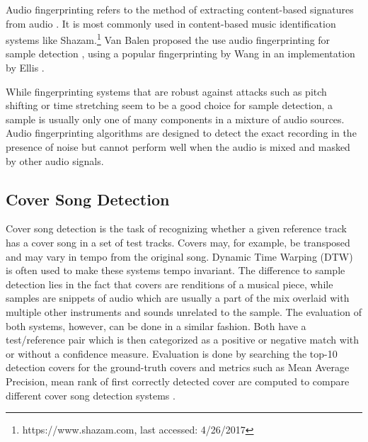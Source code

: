 \documentclass{article}
\begin{document}
Audio fingerprinting refers to the method of extracting content-based signatures from audio \cite{cano2005review,haitsma2002highly,baluja2007audio}. It is most commonly used in content-based music identification systems like Shazam.\footnote{https://www.shazam.com, last accessed: 4/26/2017}
Van Balen proposed the use audio fingerprinting for sample detection \cite{van2011automatic}, using a popular fingerprinting by Wang \cite{wang2003industrial} in an implementation by Ellis \cite{ellisfinger}. 

While fingerprinting systems that are robust against attacks such as pitch shifting or time stretching seem to be a good choice for sample detection, a sample is usually only one of many components in a mixture of audio sources. Audio fingerprinting algorithms are designed to detect the exact recording in the presence of noise but cannot perform well when the audio is mixed and masked by other audio signals.

\subsection{Cover Song Detection}
Cover song detection is the task of recognizing whether a given reference track has a cover song in a set of test tracks\cite{Ellis2007Cover,ravuri2010cover,bertin2011large}.
Covers may, for example, be transposed and may vary in tempo from the original song. Dynamic Time Warping (DTW) \cite{sakoe1978dynamic} is often used to make these systems tempo invariant. The difference to sample detection lies in the fact that covers are renditions of a musical piece, while samples are snippets of audio which are usually a part of the mix overlaid with multiple other instruments and sounds unrelated to the sample.
%
The evaluation of both systems, however, can be done in a similar fashion. Both have a test/reference pair which is then categorized as a positive or negative match with or without a confidence measure. Evaluation is done by searching the top-10 detection covers for the ground-truth covers and metrics such as Mean Average Precision, mean rank of first correctly detected cover are computed to compare different cover song detection systems \cite{serracover,serra2007cover}.
\end{document}
